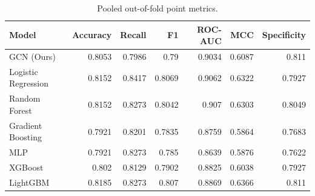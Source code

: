 \begin{table}[t]
\centering
\caption{Pooled out-of-fold point metrics.}
\label{tab:pooled}
\footnotesize
\begin{tabular}{lrrrrrr}
\toprule
Model & Accuracy & Recall & F1 & ROC-AUC & MCC & Specificity \\
\midrule
GCN (Ours) & 0.8053 & 0.7986 & 0.79 & 0.9034 & 0.6087 & 0.811 \\
Logistic Regression & 0.8152 & 0.8417 & 0.8069 & 0.9062 & 0.6322 & 0.7927 \\
Random Forest & 0.8152 & 0.8273 & 0.8042 & 0.907 & 0.6303 & 0.8049 \\
Gradient Boosting & 0.7921 & 0.8201 & 0.7835 & 0.8759 & 0.5864 & 0.7683 \\
MLP & 0.7921 & 0.8273 & 0.785 & 0.8639 & 0.5876 & 0.7622 \\
XGBoost & 0.802 & 0.8129 & 0.7902 & 0.8825 & 0.6038 & 0.7927 \\
LightGBM & 0.8185 & 0.8273 & 0.807 & 0.8869 & 0.6366 & 0.811 \\
\bottomrule
\end{tabular}
\end{table}
